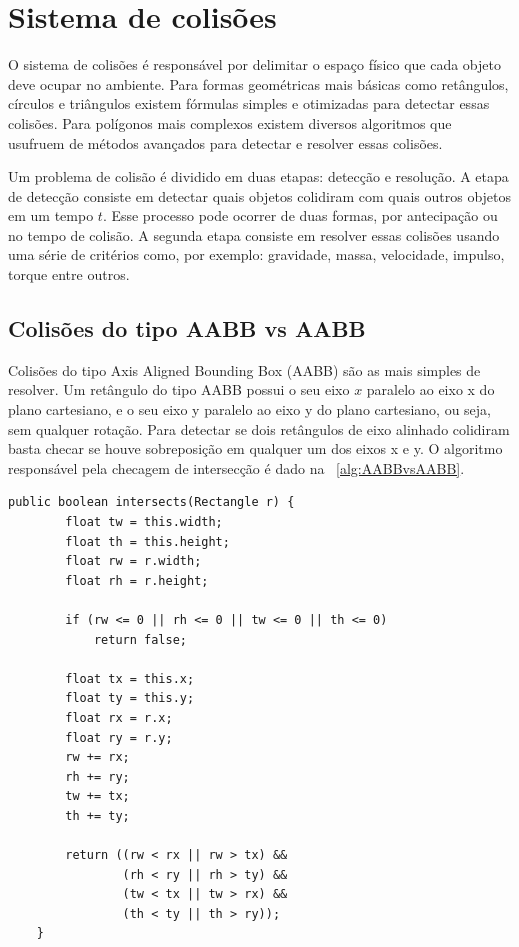 \documentclass[12pt, 
openright, 
oneside, 
a4paper,    
brazil]{facom-ufu-abntex2}
\begin{document}
\section{Sistema de colisões}

O sistema de colisões é responsável por delimitar o espaço físico que cada objeto deve ocupar no ambiente. Para formas geométricas mais básicas como retângulos, círculos e triângulos existem fórmulas simples e otimizadas para detectar essas colisões. Para polígonos mais complexos existem diversos algoritmos que usufruem de métodos avançados para detectar e resolver essas colisões.

Um problema de colisão é dividido em duas etapas: detecção e resolução. A etapa de detecção consiste em detectar quais objetos colidiram com quais outros objetos em um tempo $t$. Esse processo pode ocorrer de duas formas, por antecipação ou no tempo de colisão. A segunda etapa consiste em resolver essas colisões usando uma série de critérios como, por exemplo: gravidade, massa, velocidade, impulso, torque entre outros.

\subsection{Colisões do tipo AABB vs AABB}

Colisões do tipo Axis Aligned Bounding Box (AABB) são as mais simples de resolver. Um retângulo do tipo AABB possui o seu eixo $x$ paralelo ao eixo x do plano cartesiano, e o seu eixo y paralelo ao eixo y do plano cartesiano, ou seja, sem qualquer rotação. Para detectar se dois retângulos de eixo alinhado colidiram basta checar se houve sobreposição em qualquer um dos eixos x e y. O algoritmo responsável pela checagem de intersecção é dado na \lstlistingname~\ref{alg:AABBvsAABB}.

\begin{lstlisting}[caption=Colisão AABB vs AABB, label={alg:AABBvsAABB}]
	public boolean intersects(Rectangle r) {
    	float tw = this.width;
        float th = this.height;
        float rw = r.width;
        float rh = r.height;
        
        if (rw <= 0 || rh <= 0 || tw <= 0 || th <= 0) 
            return false;
        
        float tx = this.x;
        float ty = this.y;
        float rx = r.x;
        float ry = r.y;
        rw += rx;
        rh += ry;
        tw += tx;
        th += ty;
      
        return ((rw < rx || rw > tx) && 
                (rh < ry || rh > ty) &&
                (tw < tx || tw > rx) && 
                (th < ty || th > ry)); 
    }
\end{lstlisting}
\end{document}
